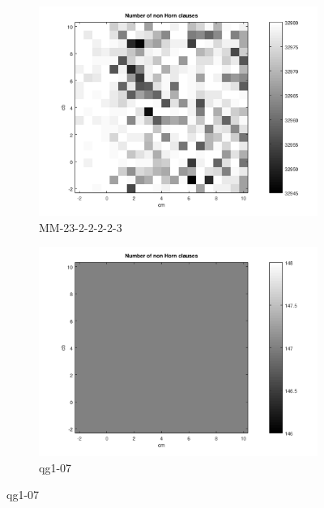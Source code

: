 \documentclass[12pt,a4paper]{article}
\begin{document}
\begin{figure}[H]
  \begin{subfigure}{0.5\textwidth}
    \includegraphics[width=\textwidth]{probSAT/probSATpoly_MM-23-2-2-2-2-3[SKIP=0].png}
    \caption{MM-23-2-2-2-2-3}
  \end{subfigure}
  \begin{subfigure}{0.5\textwidth}
    \includegraphics[width=\textwidth]{probSAT/probSATpoly_qg1-07[SKIP=0].png}
    \caption{qg1-07}
  \end{subfigure}
  

\end{figure}
\end{document}
